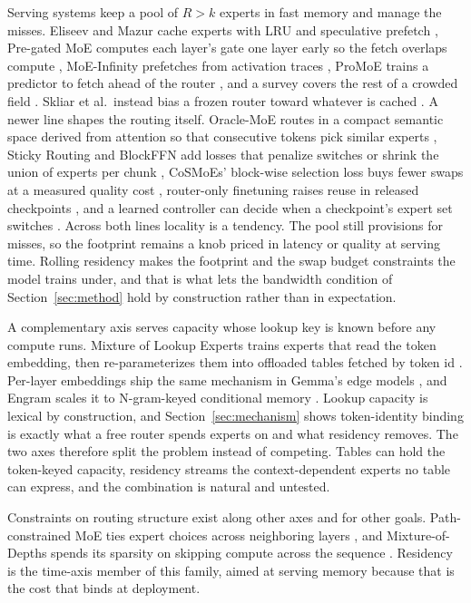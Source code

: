 \documentclass{article}
\begin{document}
Serving systems keep a pool of $R > k$ experts in fast memory and manage the misses. Eliseev
and Mazur cache experts with LRU and speculative prefetch \cite{eliseev2023}, Pre-gated MoE
computes each layer's gate one layer early so the fetch overlaps compute \cite{hwang2023pregated},
MoE-Infinity prefetches from activation traces \cite{xue2024moeinfinity}, ProMoE trains a
predictor to fetch ahead of the router \cite{song2024promoe}, and a survey covers the rest of a
crowded field \cite{liu2024moesurvey}. Skliar et al.\ instead bias a frozen router toward
whatever is cached \cite{skliar2024}. A newer line shapes the routing itself. Oracle-MoE routes
in a compact semantic space derived from attention so that consecutive tokens pick similar
experts \cite{zhou2025oracle}, Sticky Routing and BlockFFN add losses that penalize switches or
shrink the union of experts per chunk \cite{kayyam2026sticky,song2025blockffn}, CoSMoEs'
block-wise selection loss buys fewer swaps at a measured quality cost \cite{huber2025cosmoes},
router-only finetuning raises reuse in released checkpoints \cite{zhu2026reuse,raje2026melinoe},
and a learned controller can decide when a checkpoint's expert set switches
\cite{shen2026temporally}. Across both lines locality is a tendency. The pool still provisions
for misses, so the footprint remains a knob priced in latency or quality at serving time.
Rolling residency makes the footprint and the swap budget constraints the model trains under,
and that is what lets the bandwidth condition of Section~\ref{sec:method} hold by construction
rather than in expectation.

A complementary axis serves capacity whose lookup key is known before any compute runs. Mixture
of Lookup Experts trains experts that read the token embedding, then re-parameterizes them into
offloaded tables fetched by token id \cite{jie2025mole}. Per-layer embeddings ship the same
mechanism in Gemma's edge models \cite{gemmateam2026}, and Engram scales it to N-gram-keyed
conditional memory \cite{cheng2026engram}. Lookup capacity is lexical by construction, and
Section~\ref{sec:mechanism} shows token-identity binding is exactly what a free router spends
experts on and what residency removes. The two axes therefore split the problem instead of
competing. Tables can hold the token-keyed capacity, residency streams the context-dependent
experts no table can express, and the combination is natural and untested.

Constraints on routing structure exist along other axes and for other goals. Path-constrained
MoE ties expert choices across neighboring layers \cite{gu2026pathmoe}, and Mixture-of-Depths
spends its sparsity on skipping compute across the sequence \cite{raposo2024mod}. Residency is
the time-axis member of this family, aimed at serving memory because that is the cost that
binds at deployment.
\end{document}
